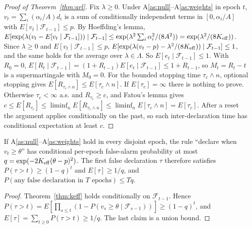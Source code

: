 \begin{proof}[Proof of Theorem~\ref{thm:arl}]
Fix $\lambda\ge0$. Under A\ref{as:null}--A\ref{as:weights} in epoch $t$, $v_t=\sum_i(\alpha_i/A)d_i$ is a sum of conditionally independent terms in $[0,\alpha_i/A]$ with $E[v_t\mid\mathcal F_{t-1}]\le p$. By Hoeffding's lemma, $E[\exp(\lambda(v_t-E[v_t\mid\mathcal F_{t-1}]))\mid\mathcal F_{t-1}]\le\exp(\lambda^2\sum_i\alpha_i^2/(8A^2))=\exp(\lambda^2/(8K_{\mathrm{eff}}))$. Since $\lambda\ge0$ and $E[v_t\mid\mathcal F_{t-1}]\le p$, $E[\exp(\lambda(v_t-p)-\lambda^2/(8K_{\mathrm{eff}}))\mid\mathcal F_{t-1}]\le1$, and the same holds for the average over $\lambda\in\Lambda$. So $E[e_t\mid\mathcal F_{t-1}]\le1$. With $R_0=0$, $E[R_t\mid\mathcal F_{t-1}]=(1+R_{t-1})E[e_t\mid\mathcal F_{t-1}]\le1+R_{t-1}$, so $M_t=R_t-t$ is a supermartingale with $M_0=0$. For the bounded stopping time $\tau_c\wedge n$, optional stopping gives $E[R_{\tau_c\wedge n}]\le E[\tau_c\wedge n]$. If $E[\tau_c]=\infty$ there is nothing to prove. Otherwise $\tau_c<\infty$ a.s. and $R_{\tau_c}\ge c$, and Fatou's lemma gives $c\le E[R_{\tau_c}]\le\liminf_nE[R_{\tau_c\wedge n}]\le\liminf_nE[\tau_c\wedge n]=E[\tau_c]$. After a reset the argument applies conditionally on the past, so each inter-declaration time has conditional expectation at least $c$.
\end{proof}

\begin{corollary}\label{cor:arl-thr}
If A\ref{as:null}--A\ref{as:weights} hold in every disjoint epoch, the rule ``declare when $v_t\ge\theta$'' has conditional per-epoch false-alarm probability at most $q=\exp(-2K_{\mathrm{eff}}(\theta-p)^2)$. The first false declaration $\tau$ therefore satisfies $P(\tau>t)\ge(1-q)^t$ and $E[\tau]\ge1/q$, and $P(\text{any false declaration in }T\text{ epochs})\le Tq$.
\end{corollary}
\begin{proof}
Theorem~\ref{thm:keff} holds conditionally on $\mathcal F_{t-1}$. Hence $P(\tau>t)=E[\prod_{s\le t}(1-P(v_s\ge\theta\mid\mathcal F_{s-1}))]\ge(1-q)^t$, and $E[\tau]=\sum_{t\ge0}P(\tau>t)\ge1/q$. The last claim is a union bound.
\end{proof}

